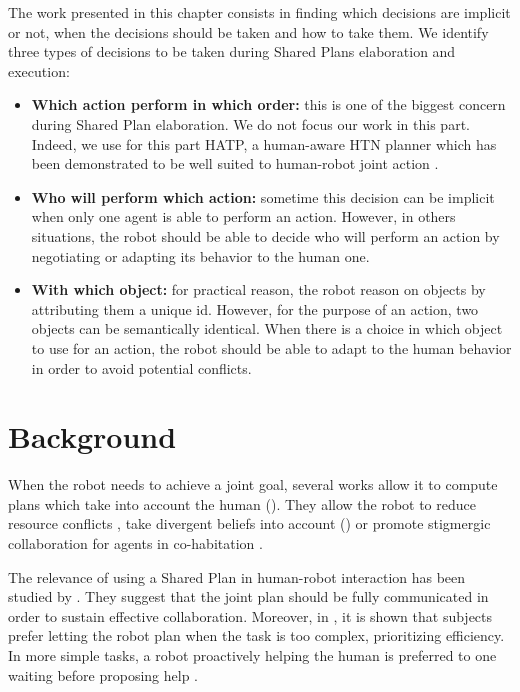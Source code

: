\documentclass[english,a4paper,11pt,twoside]{StyleThese}
\begin{document}
The work presented in this chapter consists in finding which decisions are implicit or not, when the decisions should be taken and how to take them. We identify three types of decisions to be taken during Shared Plans elaboration and execution:
\begin{itemize}
\item \textbf{Which action perform in which order:} this is one of the biggest concern during Shared Plan elaboration. We do not focus our work in this part. Indeed, we use for this part HATP, a human-aware HTN planner which has been demonstrated to be well suited to human-robot joint action \cite{Lallement2014hatp}.
\item \textbf{Who will perform which action:} sometime this decision can be implicit when only one agent is able to perform an action. However, in others situations, the robot should be able to decide who will perform an action by negotiating or adapting its behavior to the human one.
\item \textbf{With which object:} for practical reason, the robot reason on objects by attributing them a unique id. However, for the purpose of an action, two objects can be semantically identical. When there is a choice in which object to use for an action, the robot should be able to adapt to the human behavior in order to avoid potential conflicts.
\end{itemize}

\section{Background}

When the robot needs to achieve a joint goal, several works allow it to compute plans which take into account the human (\cite{cirillo2010human,Lallement2014hatp}). They allow the robot to reduce resource conflicts \cite{chakraborti2016planning}, take divergent beliefs into account (\cite{guitton2012belief,talamadupula2014coordination}) or promote stigmergic collaboration
for agents in co-habitation \cite{chakraborti2015planning}. 

The relevance of using a Shared Plan in human-robot interaction has been studied by \cite{lallee2013cooperative}. They suggest that the joint plan should be fully communicated in order to sustain effective collaboration. Moreover, in \cite{gombolay2015decision}, it is shown that subjects prefer letting the robot plan when the task is too complex, prioritizing efficiency. 
In more simple tasks, a robot proactively helping the human is preferred to one waiting before proposing help \cite{baraglia2016initiative}. 
\end{document}
